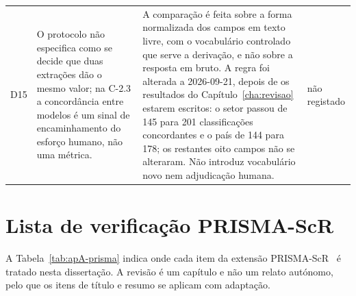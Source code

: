 {\begin{xltabular}{\linewidth}{@{}l>{\raggedright\arraybackslash}X>{\raggedright\arraybackslash}Xl@{}}
D15 & O protocolo não especifica como se decide que duas extrações dão o mesmo valor; na C-2.3 a concordância entre modelos é um sinal de encaminhamento do esforço humano, não uma métrica. & A comparação é feita sobre a forma normalizada dos campos em texto livre, com o vocabulário controlado que serve a derivação, e não sobre a resposta em bruto. A regra foi alterada a 2026-09-21, depois de os resultados do Capítulo~\ref{cha:revisao} estarem escritos: o setor passou de 145 para 201 classificações concordantes e o país de 144 para 178; os restantes oito campos não se alteraram. Não introduz vocabulário novo nem adjudicação humana. & não registado \\
\end{xltabular}
}

\section{Lista de verificação PRISMA-ScR}
\label{sec:apA-prisma}

A Tabela~\ref{tab:apA-prisma} indica onde cada item da extensão PRISMA-ScR~\cite{Tricco2018} é tratado nesta dissertação. A revisão é um capítulo e não um relato autónomo, pelo que os itens de título e resumo se aplicam com adaptação.

